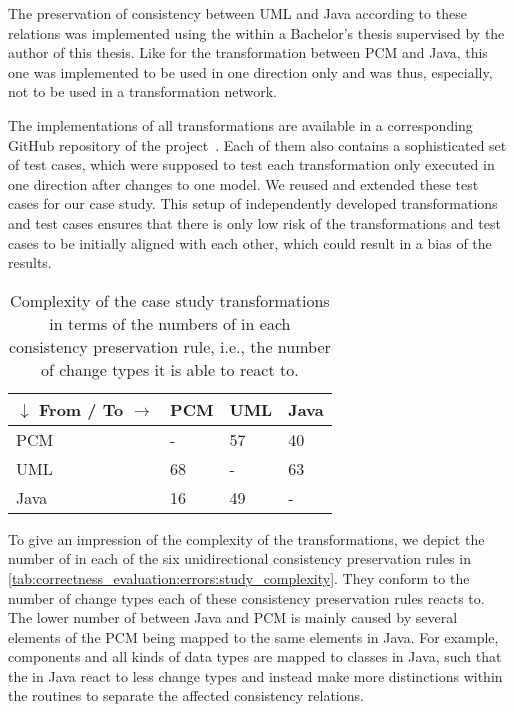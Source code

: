 The preservation of consistency between \gls{UML} and Java according to these relations was implemented using the \reactionslanguage within a Bachelor's thesis supervised by the author of this thesis.
Like for the transformation between \gls{PCM} and Java, this one was implemented to be used in one direction only and was thus, especially, not to be used in a transformation network.

The implementations of all transformations are available in a corresponding GitHub repository of the \vitruv project~\cite{vitruvCBSEGithub}.
Each of them also contains a sophisticated set of test cases, which were supposed to test each transformation only executed in one direction after changes to one model.
We reused and extended these test cases for our case study.
This setup of independently developed transformations and test cases ensures that there is only low risk of the transformations and test cases to be initially aligned with each other, which could result in a bias of the results.

\begin{table}
    \centering
    \small
    \renewcommand{\arraystretch}{1.4}
    \begin{tabular}{L{7em}C{4em}C{4em}C{4em}}
        \toprule
        \textbf{$\downarrow$ From} / \textbf{To $\rightarrow$}& \gls{PCM} & \gls{UML} & Java \\
        \midrule
        \gls{PCM} & -   & 57    & 40 \\
        \gls{UML} & 68  & -     & 63 \\
        Java      & 16  & 49    & -  \\
        \bottomrule
    \end{tabular}
    \caption[Complexity of case study transformations]{Complexity of the case study transformations in terms of the numbers of \reactions in each consistency preservation rule, i.e., the number of change types it is able to react to.}
    \label{tab:correctness_evaluation:errors:study_complexity}
\end{table}

To give an impression of the complexity of the transformations, we depict the number of \reactions in each of the six unidirectional consistency preservation rules in \autoref{tab:correctness_evaluation:errors:study_complexity}.
They conform to the number of change types each of these consistency preservation rules reacts to.
The lower number of \reactions between Java and \gls{PCM} is mainly caused by several elements of the \gls{PCM} being mapped to the same elements in Java.
For example, components and all kinds of data types are mapped to classes in Java, such that the \reactions in Java react to less change types and instead make more distinctions within the routines to separate the affected consistency relations.

